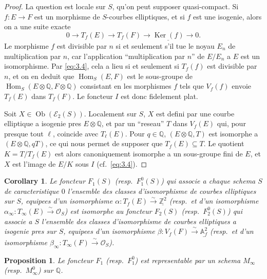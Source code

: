 \documentclass[11pt,reqno]{amsart}
\theoremstyle{plain}
\newtheorem{proposition}[theorem]{Proposition}
\newtheorem{corollary}[theorem]{Corollary}
\theoremstyle{remark}
\DeclareMathOperator{\Hom}{Hom}
\DeclareMathOperator{\Ker}{Ker}
\DeclareMathOperator{\Ob}{Ob}
\newcommand{\shO}{\mathcal{O}}
\newcommand{\Z}{\mathbb{Z}}
\newcommand{\Q}{\mathbb{Q}}
\newcommand{\A}{\mathbb{A}}
\newcommand{\isom}{\xrightarrow{\sim}}
\numberwithin{equation}{section}
\begin{document}
\begin{proof}
La question est locale sur $S$, qu'on peut supposer quasi-compact. Si $f: E \to F$ est un morphisme de $S$-courbes elliptiques, et si $f$ est une isogenie, alors on a une suite exacte
\begin{equation}\label{eq:3.4}
0 \to T_f(E) \to T_f(F) \to \underline{\Ker(f)} \to 0.
\end{equation}
Le morphisme $f$ est divisible par $n$ si et seulement s'il tue le noyau $E_n$ de multiplication par $n$, car l'application ``multiplication par $n$'' de $E/E_n$ a $E$ est un isomorphisme. Par \eqref{eq:3.4}, cela a lieu si et seulement si $T_f(f)$ est divisible par $n$, et on en deduit que $\Hom_S(E, F)$ est le sous-groupe de $\Hom_S(E \otimes \Q, F \otimes \Q)$ consistant en les morphismes $f$ tels que $V_f(f)$ envoie $T_f(E)$ dans $T_f(F)$. Le foncteur $I$ est donc fidelement plat.

Soit $X \in \Ob(\mathcal{E}_2(S))$. Localement sur $S$, $X$ est defini par une courbe elliptique a isogenie pres $E \otimes \Q$, et par un ``reseau'' $T$ dans $V_f(E)$ qui, pour presque tout $\ell$, coincide avec $T_\ell(E)$. Pour $q \in \Q$, $(E \otimes \Q, T)$ est isomorphe a $(E \otimes \Q, qT)$, ce qui nous permet de supposer que $T_f(E) \subseteq T$. Le quotient $K = T/T_f(E)$ est alors canoniquement isomorphe a un sous-groupe fini de $E$, et $X$ est l'image de $E/K$ sous $I$ (cf.~\eqref{eq:3.4}).
\end{proof}

\begin{corollary}\label{cor:3.5}
Le foncteur $F_1(S)$ (resp.~$F_1^0(S)$) qui associe a chaque schema $S$ de caracteristique $0$ l'ensemble des classes d'isomorphisme de courbes elliptiques sur $S$, equipees d'un isomorphisme $\alpha: T_f(E) \isom \underline{\Z^2}$ (resp.~et d'un isomorphisme $\alpha_\infty: T_\infty(E) \isom \shO_S$) est isomorphe au foncteur $F_2(S)$ (resp.~$F_2^0(S)$) qui associe a $S$ l'ensemble des classes d'isomorphisme de courbes elliptiques a isogenie pres sur $S$, equipees d'un isomorphisme $\beta: V_f(F) \isom \underline{\A_f^2}$ (resp.~et d'un isomorphisme $\beta_\infty: T_\infty(F) \isom \shO_S$).
\end{corollary}

\begin{proposition}\label{prop:3.6}
Le foncteur $F_1$ (resp.~$F_1^0$) est representable par un schema $M_\infty$ (resp.~$M_\infty^0$) sur $\Q$.
\end{proposition}
\end{document}

